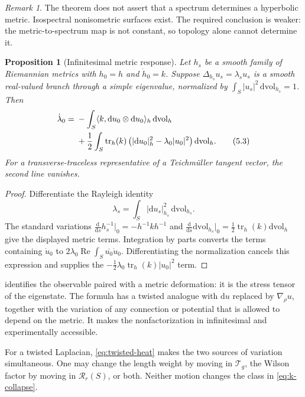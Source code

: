 \documentclass[11pt]{article}
\newtheorem{proposition}[theorem]{Proposition}
\theoremstyle{definition}
\theoremstyle{remark}
\newtheorem{remark}[theorem]{Remark}
\newcommand{\cR}{\mathcal R}
\newcommand{\cT}{\mathcal T}
\newcommand{\dd}{\mathrm d}
\begin{document}
\begin{remark}
The theorem does not assert that a spectrum determines a hyperbolic metric.
Isospectral nonisometric surfaces exist.  The required conclusion is weaker:
the metric-to-spectrum map is not constant, so topology alone cannot determine
it.
\end{remark}

\begin{proposition}[Infinitesimal metric response]
\label{prop:metric-variation}
Let \(h_s\) be a smooth family of Riemannian metrics with
\(h_0=h\) and \(\dot h_0=k\).  Suppose
\(\Delta_{h_s}u_s=\lambda_su_s\) is a smooth real-valued branch through a simple
eigenvalue, normalized by
\(\int_S|u_s|^2\,\dd\mathrm{vol}_{h_s}=1\).  Then
\begin{align}
\dot\lambda_0
={}&-\int_S
       \langle k,\dd u_0\otimes\dd u_0\rangle_h\,
       \dd\mathrm{vol}_h \notag\\
&+\frac12\int_S
       \operatorname{tr}_h(k)
       \left(
         |\dd u_0|_h^2-\lambda_0|u_0|^2
       \right)
       \dd\mathrm{vol}_h .
\tag{5.3}\label{eq:metric-variation}
\end{align}
For a transverse-traceless representative of a Teichm\"uller tangent vector,
the second line vanishes.
\end{proposition}

\begin{proof}
Differentiate the Rayleigh identity
\[
 \lambda_s=\int_S|\dd u_s|_{h_s}^2\,
                   \dd\mathrm{vol}_{h_s}.
\]
The standard variations
\(\frac{\dd}{\dd s}h_s^{-1}|_0=-h^{-1}kh^{-1}\) and
\(\frac{\dd}{\dd s}\dd\mathrm{vol}_{h_s}|_0
 =\frac12\operatorname{tr}_h(k)\dd\mathrm{vol}_h\)
give the displayed metric terms.  Integration by parts converts the terms
containing \(\dot u_0\) to
\(2\lambda_0\operatorname{Re}\int_S\overline{u_0}\dot u_0\).
Differentiating the normalization cancels this expression and supplies the
\(-\frac12\lambda_0\operatorname{tr}_h(k)|u_0|^2\) term.
\end{proof}

 identifies the observable paired with a metric
deformation: it is the stress tensor of the eigenstate.  The formula has a
twisted analogue with \(\dd u\) replaced by \(\nabla_\rho u\), together with
the variation of any connection or potential that is allowed to depend on
the metric.  It makes the nonfactorization in
 infinitesimal and experimentally
accessible.

For a twisted Laplacian, \eqref{eq:twisted-heat} makes the two sources of
variation simultaneous.  One may change the length weight by moving in
\(\cT_g\), the Wilson factor by moving in \(\cR_r(S)\), or both.  Neither
motion changes the class in \eqref{eq:k-collapse}.
\end{document}
